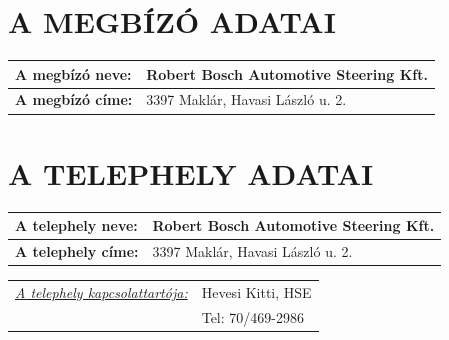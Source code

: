\documentclass[a4paper,12pt]{article}
\renewcommand{\arraystretch}{0.5}
\begin{document}
	
	\section{A MEGBÍZÓ ADATAI}
		\begin{adjustwidth}{1cm}{0cm}
			
			\vspace{0.5em} %
			
			\noindent
			\renewcommand{\arraystretch}{1.4} %
			
			\begin{tabularx}{\textwidth}{ | p{4.5cm} | X | } %
				\hline
				\textbf{A megbízó neve:} & \textbf{Robert Bosch Automotive Steering Kft.} \\ \hline
				\textbf{A megbízó címe:} & 3397 Maklár, Havasi László u. 2. \\ \hline
			\end{tabularx}
			
		\end{adjustwidth}
		
	\section{A TELEPHELY ADATAI}
		\begin{adjustwidth}{1cm}{0cm}
			\vspace{0.5em} %
			
			\noindent
			\renewcommand{\arraystretch}{1.4} %
			
			
			\begin{tabularx}{\textwidth}{ | p{4.5cm} | X | } %
				\hline
				\textbf{A telephely neve:} & \textbf{Robert Bosch Automotive Steering Kft.} \\ \hline
				\textbf{A telephely címe:} & 3397 Maklár, Havasi László u. 2. \\ \hline
			\end{tabularx}
			
			\vspace{0.5em} %
			
			\begin{tabular}{ p{5.5cm} p{8cm} } 
				\textit{\underline{A telephely kapcsolattartója:}} & Hevesi Kitti, HSE \\
				& Tel: 70/469-2986
			\end{tabular}
			
		\end{adjustwidth}
	
\end{document}

